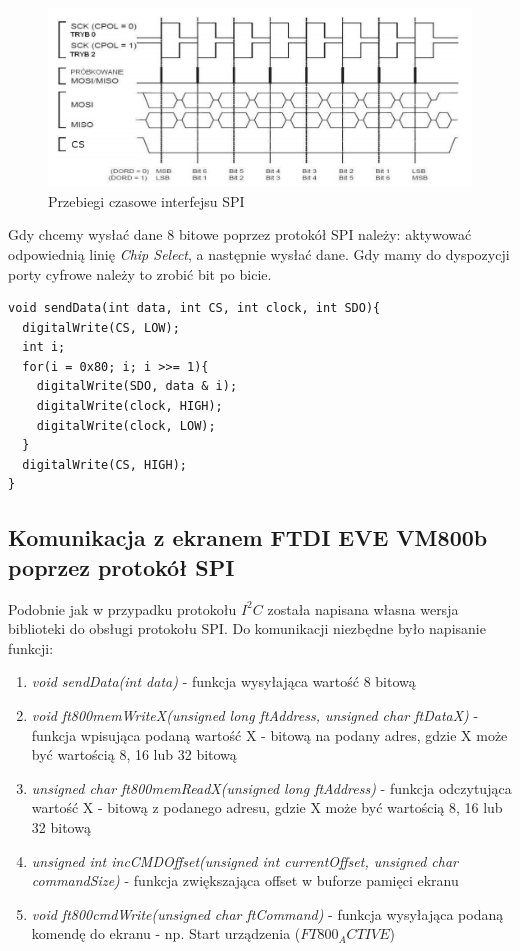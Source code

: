 \documentclass{xmgr}
\begin{document}
\begin{figure}[!h]
    \centering
    \includegraphics[height=0.25\textheight]{images/spi.png}
    \caption{Przebiegi czasowe interfejsu SPI}
\end{figure}

Gdy chcemy wysłać dane 8 bitowe poprzez protokół SPI należy: aktywować odpowiednią linię \emph{Chip Select}, a następnie wysłać dane. Gdy mamy do dyspozycji porty cyfrowe należy to zrobić bit po bicie.
\begin{lstlisting}[label=bot-dirs-alg,caption=Wysłanie danych 8 bitowych za pomocą protokołu SPI]
void sendData(int data, int CS, int clock, int SDO){
  digitalWrite(CS, LOW);
  int i;
  for(i = 0x80; i; i >>= 1){
    digitalWrite(SDO, data & i);
    digitalWrite(clock, HIGH);
    digitalWrite(clock, LOW);
  }
  digitalWrite(CS, HIGH);
}
\end{lstlisting}

\subsection{Komunikacja z ekranem FTDI EVE VM800b poprzez protokół SPI}
Podobnie jak w przypadku protokołu $I^2C$ została napisana własna wersja biblioteki do obsługi protokołu SPI. Do komunikacji niezbędne było napisanie funkcji:
\begin{enumerate}
	\item \emph{void sendData(int data)} - funkcja wysyłająca wartość 8 bitową
	\item \emph{void ft800memWriteX(unsigned long ftAddress, unsigned char ftDataX)} - funkcja wpisująca podaną wartość X - bitową na podany adres, gdzie X może być wartością 8, 16 lub 32 bitową
	\item \emph{unsigned char ft800memReadX(unsigned long ftAddress)} - funkcja odczytująca wartość X - bitową z podanego adresu, gdzie X może być wartością 8, 16 lub 32 bitową
	\item \emph{unsigned int incCMDOffset(unsigned int currentOffset, unsigned char commandSize)} - funkcja zwiększająca offset w buforze pamięci ekranu
	\item \emph{void ft800cmdWrite(unsigned char ftCommand)} - funkcja wysyłająca podaną komendę do ekranu - np. Start urządzenia ($FT800_ACTIVE$)
\end{enumerate}
\end{document}
